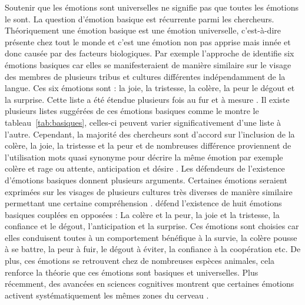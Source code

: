\documentclass[a4paper,12pt, openany]{book}
\begin{document}
Soutenir que les émotions sont universelles ne signifie pas que toutes les émotions le sont. 
La question d'émotion basique est récurrente parmi les chercheurs. Théoriquement une émotion basique est une émotion universelle, c'est-à-dire présente chez tout le monde et c'est une émotion non pas apprise mais innée et donc causée par des facteurs biologiques. Par exemple l'approche de \textcite{ekman71} identifie six émotions basiques car elles se manifesteraient de manière similaire sur le visage des membres de plusieurs tribus et cultures différentes indépendamment de la langue. Ces six émotions sont : la joie, la tristesse, la colère, la peur le dégout et la surprise. Cette liste a été étendue plusieurs fois au fur et à mesure \parencites{ekman92a, ekman99}. Il existe plusieurs listes suggérées de ces émotions basiques comme le montre le tableau~\ref{tab:basiques}, celles-ci peuvent varier significativement d'une liste à l'autre. Cependant, la majorité des chercheurs sont d'accord sur l'inclusion de la colère, la joie, la tristesse et la peur et de nombreuses différence proviennent de l'utilisation mots quasi synonyme pour décrire la même émotion par exemple colère et rage ou attente, anticipation et désire \parencite{ortony90}.  Les défendeurs de l'existence d'émotions basiques donnent plusieurs arguments. Certaines émotions seraient exprimées sur les visages de plusieurs cultures très diverses de manière similaire permettant une certaine compréhension \parencite{ekman92b}. \textcite{plutchik62} défend l'existence de huit émotions basiques couplées en opposées : La colère et la peur, la joie et la tristesse, la confiance et le dégout, l'anticipation et la surprise. Ces émotions sont choisies car elles conduisent toutes à un comportement bénéfique à la survie, la colère pousse à se battre, la peur à fuir, le dégout à éviter, la confiance à la coopération etc. De plus, ces émotions se retrouvent chez de nombreuses espèces animales, cela renforce la théorie que ces émotions sont basiques et universelles. Plus récemment, des avancées en sciences cognitives montrent que certaines émotions activent systématiquement les mêmes zones du cerveau \parencite{celeghin17}. \par  
\end{document}
